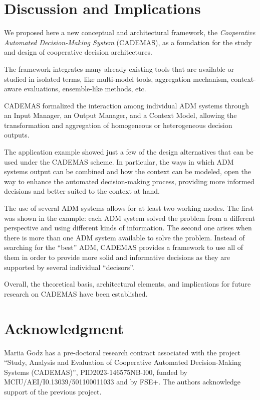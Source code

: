 \documentclass[letterpaper, 10 pt,conference]{IEEEconf}
\begin{document}
\section{Discussion and Implications\label{sect:conclus}}
We proposed here a new conceptual and architectural framework, the \emph{Cooperative Automated Decision-Making System} (CADEMAS), as a foundation for the study and design of cooperative decision architectures. 

The framework integrates many already existing tools that are available or studied in isolated terms, like multi-model tools, aggregation mechanism, context-aware evaluations, ensemble-like methods, etc. 

CADEMAS formalized the interaction among individual ADM systems through an Input Manager, an Output Manager, and a Context Model, allowing the transformation and aggregation of homogeneous or heterogeneous decision outputs. 

The application example showed just a few of the design alternatives that can be used under the CADEMAS scheme. In particular, the ways in which ADM systems output can be combined and how the context can be modeled, open the way to enhance the automated decision-making process, providing more informed decisions and better suited to the context at hand. 

The use of several ADM systems allows for at least two working modes. The first was shown in the example: each ADM system solved the problem from a different perspective and using different kinds of information. The second one arises when there is more than one ADM system available to solve the problem. Instead of searching for the ``best'' ADM, CADEMAS provides a framework to use all of them in order to provide more solid and informative decisions as they are supported by several individual ``decisors''.


Overall, the theoretical basis, architectural elements, and implications for future research on CADEMAS have been established.

\section*{Acknowledgment}
Mariia Godz has a pre-doctoral research contract associated with the project “Study, Analysis and Evaluation of Cooperative Automated Decision-Making Systems (CADEMAS)”, PID2023-146575NB-I00, funded by MCIU/AEI/I0.13039/501100011033 and by FSE+. The authors acknowledge support of the previous project.
\end{document}
